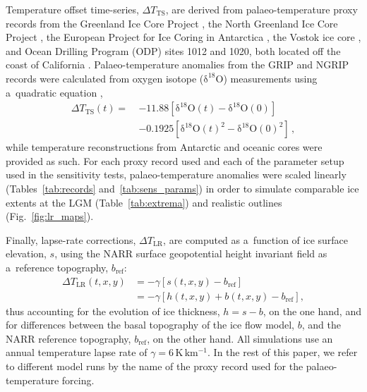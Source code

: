 \documentclass{article}
\newcommand{\chem}[1]{\ensuremath{\mathrm{#1}}}
\newcommand{\unit}[1]{\ensuremath{\mathrm{#1}}}
\begin{document}
      Temperature offset time-series, ${\Delta}T_{\text{TS}}$, are derived
      from palaeo-temperature proxy records from the Greenland Ice Core
      Project \citep[GRIP,][]{Dansgaard.etal.1993}, the North Greenland Ice
      Core Project \citep[NGRIP,][]{Andersen.etal.2004}, the European
      Project for Ice Coring in Antarctica \citep[EPICA,][]
      {Jouzel.etal.2007}, the Vostok ice core \citep{Petit.etal.1999}, and
      Ocean Drilling Program (ODP) sites 1012 and 1020, both located off the
      coast of California \citep{Herbert.etal.2001}. Palaeo-temperature
      anomalies from the GRIP and NGRIP records were calculated from oxygen
      isotope (\chem{\delta^{18}O}) measurements using a~quadratic equation
      \citep{Johnsen.etal.1995},
\begin{align}
{\Delta}T_{\text{TS}}(t) ={~}&-11.88 [\chem{\delta^{18}O}(t)
                                -\chem{\delta^{18}O}(0)] \nonumber \\
                        &-0.1925[\chem{\delta^{18}O}(t)^2
                                 -\chem{\delta^{18}O}(0)^2] \,,
\end{align}
      while temperature reconstructions from Antarctic and oceanic cores
      were provided as such. For each proxy record used and each of the
      parameter setup used in the sensitivity tests, palaeo-temperature
      anomalies were scaled linearly (Tables~\ref{tab:records}
      and~\ref{tab:sens_params}) in order to simulate comparable ice extents
      at the LGM (Table~\ref{tab:extrema}) and realistic outlines
      (Fig.~\ref{fig:lr_maps}).

      Finally, lapse-rate corrections, ${\Delta}T_{\text{LR}}$, are computed
      as a~function of ice surface elevation, $s$, using the NARR surface
      geopotential height invariant field as a~reference topography,
      $b_{\text{ref}}$:
\begin{align}
{\Delta}T_{\text{LR}}(t, x, y) &= -\gamma [s(t, x, y)-b_{\text{ref}}] \\
                            &= -\gamma [h(t, x, y)+b(t, x, y)-b_{\text{ref}}],
\end{align}
      thus accounting for the evolution of ice thickness, ${h=s-b}$, on the
      one hand, and for differences between the basal topography of the ice
      flow model, $b$, and the NARR reference topography, $b_{\text{ref}}$,
      on the other hand. All simulations use an annual temperature lapse
      rate of $\gamma = 6\,\unit{K\,km^{-1}}$. In the rest of this paper, we
      refer to different model runs by the name of the proxy record used for
      the palaeo-temperature forcing.
\end{document}
